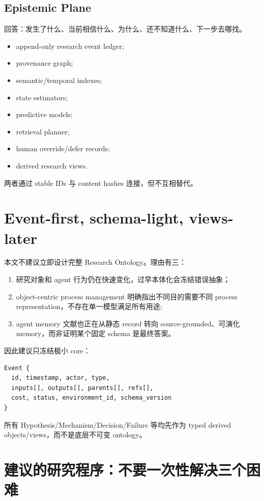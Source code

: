 \documentclass[11pt,a4paper]{ctexart}
\begin{document}
\subsection{Epistemic Plane}
回答：发生了什么、当前相信什么、为什么、还不知道什么、下一步去哪找。
\begin{itemize}
\item append-only research event ledger;
\item provenance graph;
\item semantic/temporal indexes;
\item state estimators;
\item predictive models;
\item retrieval planner;
\item human override/defer records;
\item derived research views.
\end{itemize}

两者通过 stable IDs 与 content hashes 连接，但不互相替代。

\section{Event-first, schema-light, views-later}

本文不建议立即设计完整 Research Ontology。理由有三：
\begin{enumerate}
\item 研究对象和 agent 行为仍在快速变化，过早本体化会冻结错误抽象；
\item object-centric process management 明确指出不同目的需要不同 process representation，不存在单一模型满足所有用途\parencite{vanderAalst2026ocpm};
\item agent memory 文献也正在从静态 record 转向 source-grounded、可演化 memory，而非证明某个固定 schema 是最终答案\parencite{sun2026trajwiki,chen2026mage}。
\end{enumerate}

因此建议只冻结极小 core：
\begin{verbatim}
Event {
  id, timestamp, actor, type,
  inputs[], outputs[], parents[], refs[],
  cost, status, environment_id, schema_version
}
\end{verbatim}
所有 Hypothesis/Mechanism/Decision/Failure 等均先作为 typed derived objects/views，而不是底层不可变 ontology。

\section{建议的研究程序：不要一次性解决三个困难}
\end{document}

